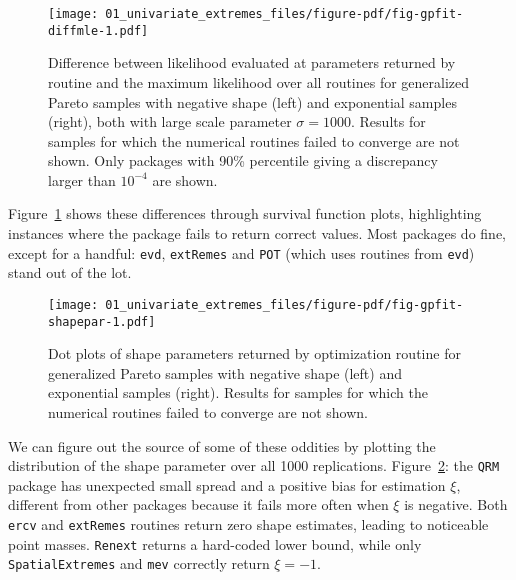 \documentclass[
  letterpaper,
  DIV=11,
  numbers=noendperiod]{scrartcl}
\begin{document}
\begin{figure}

{\centering \texttt{[image: 01\_univariate\_extremes\_files/figure-pdf/fig-gpfit-diffmle-1.pdf]}

}

\caption{\label{fig-gpfit-diffmle}Difference between likelihood
evaluated at parameters returned by routine and the maximum likelihood
over all routines for generalized Pareto samples with negative shape
(left) and exponential samples (right), both with large scale parameter
\(\sigma=1000\). Results for samples for which the numerical routines
failed to converge are not shown. Only packages with 90\% percentile
giving a discrepancy larger than \(10^{-4}\) are shown.}

\end{figure}

Figure~\ref{fig-gpfit-diffmle} shows these differences through survival
function plots, highlighting instances where the package fails to return
correct values. Most packages do fine, except for a handful:
\texttt{evd}, \texttt{extRemes} and \texttt{POT} (which uses routines
from \texttt{evd}) stand out of the lot.

\begin{figure}

{\centering \texttt{[image: 01\_univariate\_extremes\_files/figure-pdf/fig-gpfit-shapepar-1.pdf]}

}

\caption{\label{fig-gpfit-shapepar}Dot plots of shape parameters
returned by optimization routine for generalized Pareto samples with
negative shape (left) and exponential samples (right). Results for
samples for which the numerical routines failed to converge are not
shown.}

\end{figure}

We can figure out the source of some of these oddities by plotting the
distribution of the shape parameter over all 1000 replications.
Figure~\ref{fig-gpfit-shapepar}: the \texttt{QRM} package has unexpected
small spread and a positive bias for estimation \(\xi\), different from
other packages because it fails more often when \(\xi\) is negative.
Both \texttt{ercv} and \texttt{extRemes} routines return zero shape
estimates, leading to noticeable point masses. \texttt{Renext} returns a
hard-coded lower bound, while only \texttt{SpatialExtremes} and
\texttt{mev} correctly return \(\xi=-1\).
\end{document}

